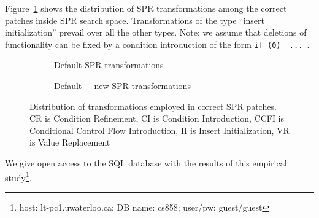 Figure~\ref{figure:transforms-old} shows the distribution of SPR transformations among the correct patches inside SPR search space. Transformations of the type ``insert initialization'' prevail over all the other types.
Note: we assume that deletions of functionality can be fixed by a condition introduction of the form \texttt{if (0) { ... }}.

\begin{figure}
\begin{subfigure}[b]{.48\linewidth}
    \small \caption{Default SPR transformations}
    \label{figure:transforms-old}
\end{subfigure}
\hfill
\begin{subfigure}[b]{.48\linewidth}
    \small \caption{Default + new SPR transformations}
    \label{figure:transforms-new}
\end{subfigure}

    \small \caption{Distribution of transformations employed in correct SPR patches. CR is Condition Refinement, CI is Condition Introduction, CCFI is Conditional Control Flow Introduction, II is Insert Initialization, VR is Value Replacement}
        \label{figure:transforms}
    \vspace{-0.2in}
\end{figure}

We give open access to the SQL database with the results of this empirical study\footnote{host: lt-pc1.uwaterloo.ca; DB name: cs858; user/pw: guest/guest}.
